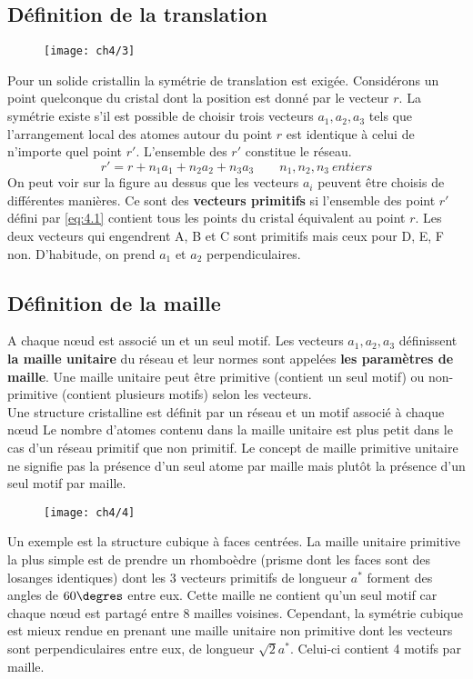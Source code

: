 	\subsection{Définition de la translation}
		\begin{wrapfigure}[5]{l}{6.5cm}
		\vspace{-5mm}
		\texttt{[image: ch4/3]}
		\end{wrapfigure}		
		Pour un solide cristallin la symétrie de translation est exigée. Considérons un point quelconque du cristal dont la position est donné par le vecteur $r$. La symétrie existe s'il est possible de choisir trois vecteurs $a_1,a_2, a_3$ tels que l'arrangement local des atomes autour du point $r$ est identique à celui de n'importe quel point $r'$. L'ensemble des $r'$ constitue le réseau. 
		\begin{equation}
			r' = r + n_1a_1 + n_2a_2 + n_3a_3 \qquad n_1,n_2,n_3 \ entiers 
			\label{eq:4.1}
		\end{equation}		 
		On peut voir sur la figure au dessus que les vecteurs $a_i$ peuvent être choisis de différentes manières. Ce sont des \textbf{vecteurs primitifs} si l'ensemble des point $r'$ défini par \autoref{eq:4.1} contient tous les points du cristal équivalent au point $r$. Les deux vecteurs qui engendrent A, B et C sont primitifs mais ceux pour D, E, F non. D'habitude, on prend $a_1$ et $a_2$ perpendiculaires.
		
		
	\subsection{Définition de la maille}
		A chaque nœud est associé un et un seul motif. Les vecteurs $a_1,a_2,a_3$ définissent \textbf{la maille unitaire} du réseau et leur normes sont appelées \textbf{les paramètres de maille}. Une maille unitaire peut être primitive (contient un seul motif) ou non-primitive (contient plusieurs motifs) selon les vecteurs. \\
		Une structure cristalline est définit par un réseau et un motif associé à chaque nœud Le nombre d'atomes contenu dans la maille unitaire est plus petit dans le cas d'un réseau primitif que non primitif. Le concept de maille primitive unitaire ne signifie pas la présence d'un seul atome par maille mais plutôt la présence d'un seul motif par maille. \\
		
		\begin{wrapfigure}[5]{l}{6cm}
		\vspace{-5mm}
		\texttt{[image: ch4/4]}
		\end{wrapfigure}		
		Un exemple est la structure cubique à faces centrées. La maille unitaire primitive la plus simple est de prendre un rhomboèdre (prisme dont les faces sont des losanges identiques) dont les 3 vecteurs primitifs de longueur $a^*$ forment des angles de $60\degres$ entre eux. Cette maille ne contient qu'un seul motif car chaque nœud est partagé entre 8 mailles voisines. Cependant, la symétrie cubique est mieux rendue en prenant une maille unitaire non primitive dont les vecteurs sont perpendiculaires entre eux, de longueur $\sqrt{2}a^*$. Celui-ci contient 4 motifs par maille.
	
